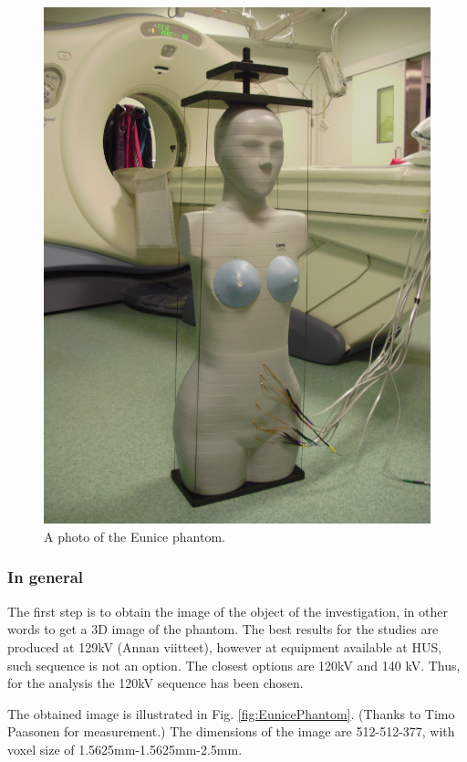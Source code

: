 \documentclass[fleqn,10pt]{SelfArx} %
\begin{document}
\begin{figure}[ht]\centering
\includegraphics[width=0.9\linewidth]{EuniceReal}
\caption{A photo of the Eunice phantom.} 

\label{fig:EuniceReal}
\end{figure}


\subsubsection{In general}
The first step is to obtain the image of the object of the investigation, in other words to get a 3D image of the phantom. The best results for the studies are produced at 129kV (Annan viitteet), however at equipment available at HUS, such sequence is not an option. The closest options are 120kV and 140 kV. Thus, for the analysis the 120kV sequence has been chosen.

The obtained image is illustrated in Fig. \ref{fig:EunicePhantom}. (Thanks to Timo Paasonen for measurement.) The dimensions of the image are 512-512-377, with voxel size of 1.5625mm-1.5625mm-2.5mm.
\end{document}
